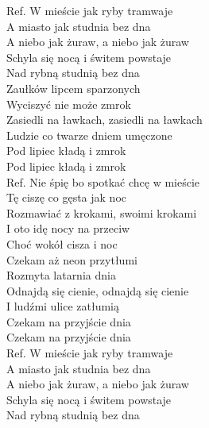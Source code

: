 
\begin{flushleft}
\vskip 3mm
Ref. W mieście jak ryby tramwaje \\
\hspace{0.9cm}A miasto jak studnia bez dna \\
\hspace{0.9cm}A niebo jak żuraw, a niebo jak żuraw \\
\hspace{0.9cm}Schyla się nocą i świtem powstaje \\
\hspace{0.9cm}Nad rybną studnią bez dna \\
\vskip 3mm
Zaułków lipcem sparzonych \tab{}\\
Wyciszyć nie może zmrok \tab{}\\
Zasiedli na ławkach, zasiedli na ławkach  \\
Ludzie co twarze dniem umęczone \\
Pod lipiec kładą i zmrok \tab{} \\
Pod lipiec kładą i zmrok \tab{} \\
\vskip 3mm
Ref. Nie śpię bo spotkać chcę w mieście\\
\hspace{0.9cm}Tę ciszę co gęsta jak noc \\
\hspace{0.9cm}Rozmawiać z krokami, swoimi krokami \\
\hspace{0.9cm}I oto idę nocy na przeciw \\
\hspace{0.9cm}Choć wokół cisza i noc \\
\vskip 3mm
Czekam aż neon przytłumi \\
Rozmyta latarnia dnia \\
Odnajdą się cienie, odnajdą się cienie \\
I ludźmi ulice zatłumią \\
Czekam na przyjście dnia \\
Czekam na przyjście dnia  \\
\vskip 3mm
Ref. W mieście jak ryby tramwaje\\
\hspace{0.9cm}A miasto jak studnia bez dna \\
\hspace{0.9cm}A niebo jak żuraw, a niebo jak żuraw \\
\hspace{0.9cm}Schyla się nocą i świtem powstaje \\
\hspace{0.9cm}Nad rybną studnią bez dna \\
\end{flushleft}
\clearpage
